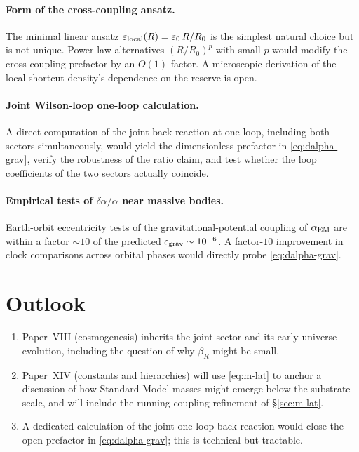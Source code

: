 \documentclass[11pt,a4paper]{article}
\begin{document}
\paragraph{Form of the cross-coupling ansatz.}
The minimal linear ansatz $\varepsilon_{\rm local}(R) =
\varepsilon_0\,R/R_0$ is the simplest natural choice but is not
unique. Power-law alternatives $(R/R_0)^p$ with small $p$ would
modify the cross-coupling prefactor by an $O(1)$ factor. A
microscopic derivation of the local shortcut density's
dependence on the reserve is open.

\paragraph{Joint Wilson-loop one-loop calculation.}
A direct computation of the joint back-reaction at one loop,
including both sectors simultaneously, would yield the
dimensionless prefactor in \eqref{eq:dalpha-grav}, verify the
robustness of the ratio claim, and test whether the loop
coefficients of the two sectors actually coincide.

\paragraph{Empirical tests of $\delta\alpha/\alpha$ near
massive bodies.}
Earth-orbit eccentricity tests \cite{Rosenband2008} of the
gravitational-potential coupling of $\alpha_{\rm EM}$ are within
a factor $\sim 10$ of the predicted $c_{\rm grav}\sim 10^{-6}$.
A factor-$10$ improvement in clock comparisons across orbital
phases would directly probe \eqref{eq:dalpha-grav}.

\section{Outlook}
\label{sec:outlook}

\begin{enumerate}
\item Paper~VIII (cosmogenesis) inherits the joint sector and
its early-universe evolution, including the question of why
$\beta_R$ might be small.
\item Paper~XIV (constants and hierarchies) will use
\eqref{eq:m-lat} to anchor a discussion of how Standard Model
masses might emerge below the substrate scale, and will
include the running-coupling refinement of \S\ref{sec:m-lat}.
\item A dedicated calculation of the joint one-loop
back-reaction would close the open prefactor in
\eqref{eq:dalpha-grav}; this is technical but tractable.
\end{enumerate}
\end{document}
